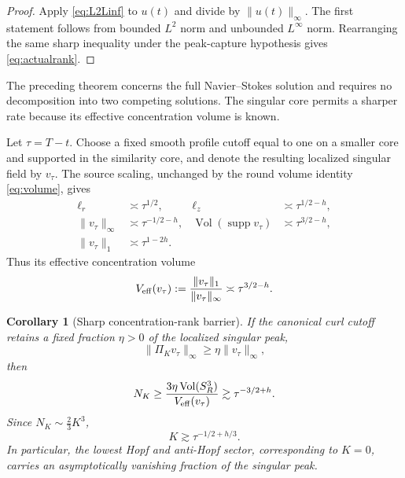 \documentclass[aps,prd,reprint,superscriptaddress,nofootinbib,floatfix]{revtex4-2}
\newtheorem{corollary}[theorem]{Corollary}
\theoremstyle{definition}
\theoremstyle{remark}
\newcommand{\Vol}{\operatorname{Vol}}
\begin{document}
\begin{proof}
	Apply \eqref{eq:L2Linf} to $u(t)$ and divide by $\|u(t)\|_\infty$.  The first statement follows from bounded $L^2$ norm and unbounded $L^\infty$ norm.  Rearranging the same sharp inequality under the peak-capture hypothesis gives \eqref{eq:actualrank}.
\end{proof}

The preceding theorem concerns the full Navier--Stokes solution and requires no decomposition into two competing solutions. The singular core permits a sharper rate because its effective concentration volume is known.

Let $\tau=T-t$.  Choose a fixed smooth profile cutoff equal to one on a smaller core and supported in the similarity core, and denote the resulting localized singular field by $v_\tau$.  The source scaling, unchanged by the round volume identity \eqref{eq:volume}, gives
\begin{align}
	\ell_r            & \asymp\tau^{1/2},                        &
	\ell_z            & \asymp\tau^{1/2-h},\label{eq:corescales}   \\
	\|v_\tau\|_\infty & \asymp\tau^{-1/2-h},                     &
	\operatorname{Vol}(\operatorname{supp}v_\tau)
	                  & \asymp\tau^{3/2-h},\nonumber               \\
	\|v_\tau\|_1      & \asymp\tau^{1-2h}. \label{eq:coreL1}
\end{align}
Thus its effective concentration volume
\begin{equation}
	V_{\rm eff}(v_\tau):=\frac{\|v_\tau\|_1}{\|v_\tau\|_\infty}
	\asymp\tau^{3/2-h}.
\end{equation}

\begin{corollary}[Sharp concentration-rank barrier]\label{cor:corerank}
	If the canonical curl cutoff retains a fixed fraction $\eta>0$ of the localized singular peak,
	\begin{equation}
		\|\Pi_Kv_\tau\|_\infty\ge\eta\|v_\tau\|_\infty,
	\end{equation}
	then
	\begin{equation}
		N_K\ge\frac{3\eta\Vol(S^3_R)}{V_{\rm eff}(v_\tau)}
		\gtrsim\tau^{-3/2+h}.
		\label{eq:coreN}
	\end{equation}
	Since $N_K\sim\frac23K^3$,
	\begin{equation}
		K\gtrsim\tau^{-1/2+h/3}.
		\label{eq:coreK}
	\end{equation}
	In particular, the lowest Hopf and anti-Hopf sector, corresponding to $K=0$, carries an asymptotically vanishing fraction of the singular peak.
\end{corollary}
\end{document}
